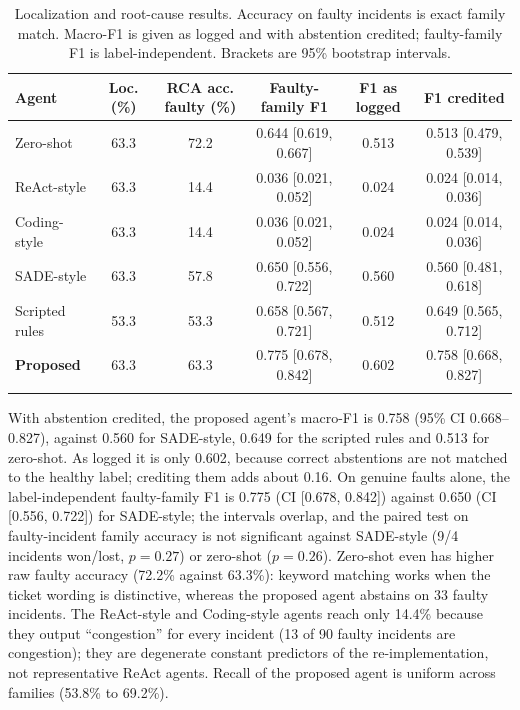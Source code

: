 \documentclass[pdflatex,sn-basic,Numbered,iicol]{sn-jnl}
\begin{document}
\begin{table}[t]
\caption{Localization and root-cause results. Accuracy on faulty incidents is exact family match. Macro-F1 is given as logged and with abstention credited; faulty-family F1 is label-independent. Brackets are 95\% bootstrap intervals.}\label{tab:rca}
\scriptsize
\begin{tabular}{@{}lccccc@{}}
\toprule
Agent & Loc. (\%) & RCA acc. faulty (\%) & Faulty-family F1 & F1 as logged & F1 credited \\
\midrule
Zero-shot & 63.3 & 72.2 & 0.644 [0.619, 0.667] & 0.513 & 0.513 [0.479, 0.539] \\
ReAct-style & 63.3 & 14.4 & 0.036 [0.021, 0.052] & 0.024 & 0.024 [0.014, 0.036] \\
Coding-style & 63.3 & 14.4 & 0.036 [0.021, 0.052] & 0.024 & 0.024 [0.014, 0.036] \\
SADE-style & 63.3 & 57.8 & 0.650 [0.556, 0.722] & 0.560 & 0.560 [0.481, 0.618] \\
Scripted rules & 53.3 & 53.3 & 0.658 [0.567, 0.721] & 0.512 & 0.649 [0.565, 0.712] \\
\textbf{Proposed} & 63.3 & 63.3 & 0.775 [0.678, 0.842] & 0.602 & 0.758 [0.668, 0.827] \\
\botrule
\end{tabular}
\end{table}

With abstention credited, the proposed agent's macro-F1 is 0.758 (95\% CI 0.668--0.827), against 0.560 for SADE-style, 0.649 for the scripted rules and 0.513 for zero-shot. As logged it is only 0.602, because correct abstentions are not matched to the healthy label; crediting them adds about 0.16. On genuine faults alone, the label-independent faulty-family F1 is 0.775 (CI [0.678, 0.842]) against 0.650 (CI [0.556, 0.722]) for SADE-style; the intervals overlap, and the paired test on faulty-incident family accuracy is not significant against SADE-style (9/4 incidents won/lost, $p=0.27$) or zero-shot ($p=0.26$). Zero-shot even has higher raw faulty accuracy (72.2\% against 63.3\%): keyword matching works when the ticket wording is distinctive, whereas the proposed agent abstains on 33 faulty incidents. The ReAct-style and Coding-style agents reach only 14.4\% because they output ``congestion'' for every incident (13 of 90 faulty incidents are congestion); they are degenerate constant predictors of the re-implementation, not representative ReAct agents. Recall of the proposed agent is uniform across families (53.8\% to 69.2\%).
\end{document}
